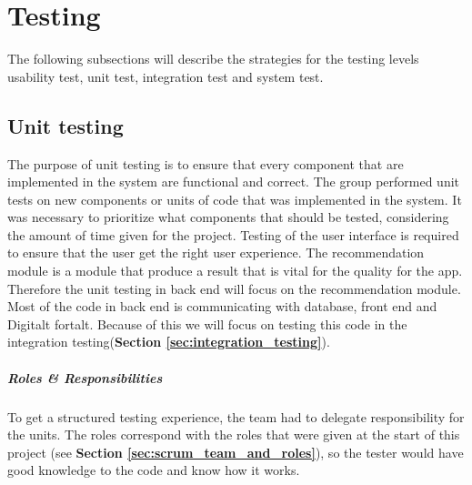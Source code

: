 \chapter{Testing}
\label{chap:testing}

The following subsections will describe the strategies for the testing levels usability test, unit test, integration test and system test. 

\section{Unit testing}
\label{sec:unit_testing}

The purpose of unit testing is to ensure that every component that are implemented in the system are functional and correct. The group performed unit tests on new components or units of code that was implemented in the system. It was necessary to prioritize what components that should be tested, considering the amount of time given for the project. Testing of the user interface is required to ensure that the user get the right user experience. The recommendation module is a module that produce a result that is vital for the quality for the app. Therefore the unit testing in back end will focus on the recommendation module. Most of the code in back end is communicating with database, front end and Digitalt fortalt. Because of this we will focus on testing this code in the integration testing(\textbf{Section \ref{sec:integration_testing}}).\newline

\paragraph{Roles \& Responsibilities}
To get a structured testing experience, the team had to delegate responsibility for the units. The roles correspond with the roles that were given at the start of this project (see \textbf{Section \ref{sec:scrum_team_and_roles}}), so the tester would have good knowledge to the code and know how it works.  



